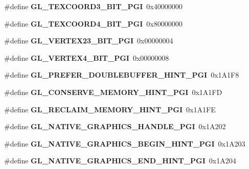 \begin{DoxyCompactItemize}
\item 
\#define {\bfseries G\+L\+\_\+\+T\+E\+X\+C\+O\+O\+R\+D3\+\_\+\+B\+I\+T\+\_\+\+P\+G\+I}~0x40000000\label{_s_d_l__opengl_8h_a8c57b3914e46f4cc7ac2c91ba48e7d98}

\item 
\#define {\bfseries G\+L\+\_\+\+T\+E\+X\+C\+O\+O\+R\+D4\+\_\+\+B\+I\+T\+\_\+\+P\+G\+I}~0x80000000\label{_s_d_l__opengl_8h_aae7878ca38fd3c5119f2d542df7aa7c9}

\item 
\#define {\bfseries G\+L\+\_\+\+V\+E\+R\+T\+E\+X23\+\_\+\+B\+I\+T\+\_\+\+P\+G\+I}~0x00000004\label{_s_d_l__opengl_8h_a10d8c2d513d9176b149a2b274b5ca2cf}

\item 
\#define {\bfseries G\+L\+\_\+\+V\+E\+R\+T\+E\+X4\+\_\+\+B\+I\+T\+\_\+\+P\+G\+I}~0x00000008\label{_s_d_l__opengl_8h_ac002ce97dfb1d8c69be39bc447166b46}

\item 
\#define {\bfseries G\+L\+\_\+\+P\+R\+E\+F\+E\+R\+\_\+\+D\+O\+U\+B\+L\+E\+B\+U\+F\+F\+E\+R\+\_\+\+H\+I\+N\+T\+\_\+\+P\+G\+I}~0x1\+A1\+F8\label{_s_d_l__opengl_8h_a54e08df09931f370cd71a9e9b11edf20}

\item 
\#define {\bfseries G\+L\+\_\+\+C\+O\+N\+S\+E\+R\+V\+E\+\_\+\+M\+E\+M\+O\+R\+Y\+\_\+\+H\+I\+N\+T\+\_\+\+P\+G\+I}~0x1\+A1\+F\+D\label{_s_d_l__opengl_8h_a41e0ff3de2eb01884561615993b553fa}

\item 
\#define {\bfseries G\+L\+\_\+\+R\+E\+C\+L\+A\+I\+M\+\_\+\+M\+E\+M\+O\+R\+Y\+\_\+\+H\+I\+N\+T\+\_\+\+P\+G\+I}~0x1\+A1\+F\+E\label{_s_d_l__opengl_8h_a379004101af841ae7562fb41897efebf}

\item 
\#define {\bfseries G\+L\+\_\+\+N\+A\+T\+I\+V\+E\+\_\+\+G\+R\+A\+P\+H\+I\+C\+S\+\_\+\+H\+A\+N\+D\+L\+E\+\_\+\+P\+G\+I}~0x1\+A202\label{_s_d_l__opengl_8h_a31b57d82a7ce6619eb00b024c93e3af5}

\item 
\#define {\bfseries G\+L\+\_\+\+N\+A\+T\+I\+V\+E\+\_\+\+G\+R\+A\+P\+H\+I\+C\+S\+\_\+\+B\+E\+G\+I\+N\+\_\+\+H\+I\+N\+T\+\_\+\+P\+G\+I}~0x1\+A203\label{_s_d_l__opengl_8h_ac1f459d4db1b7fe83c0a79c3b25a3a65}

\item 
\#define {\bfseries G\+L\+\_\+\+N\+A\+T\+I\+V\+E\+\_\+\+G\+R\+A\+P\+H\+I\+C\+S\+\_\+\+E\+N\+D\+\_\+\+H\+I\+N\+T\+\_\+\+P\+G\+I}~0x1\+A204\label{_s_d_l__opengl_8h_ab839259f846da85bb7c976082a6b509b}


\end{DoxyCompactItemize}
